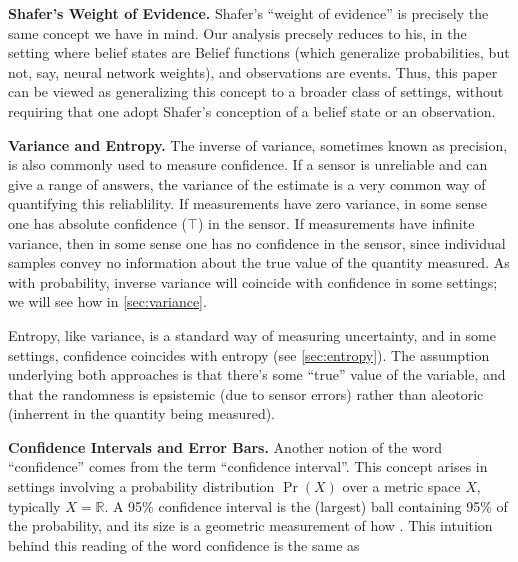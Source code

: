 {	\textbf{Shafer's Weight of Evidence.}
	Shafer's ``weight of evidence'' is precisely the same concept we have in mind.
	Our analysis precsely reduces to his, in the setting where belief states are Belief functions (which generalize probabilities, but not, say, neural network weights), and observations are events.
	Thus, this paper can be viewed as generalizing this concept to a broader class of settings, without requiring that one adopt Shafer's conception of a belief state or an observation.


	\textbf{Variance and Entropy.}
	The inverse of variance, sometimes known as precision,
		is also commonly used to measure confidence.
	If a sensor is unreliable and can give a range of answers, the variance of the estimate is a very common way of quantifying this reliablility.
	If measurements have zero variance, in some sense one has absolute confidence ($\top$) in the sensor. If measurements have infinite variance, then in some sense one has no confidence in the sensor, since individual samples convey no information about the true value of the quantity measured.
	As with probability, inverse variance will coincide with confidence in some settings; we will see how in \cref{sec:variance}.

	Entropy, like variance, is a standard way of measuring uncertainty, and in some settings, confidence coincides with entropy (see \cref{sec:entropy}).
	The assumption underlying both approaches is that there's some ``true'' value of the variable, and that the randomness is epsistemic (due to sensor errors) rather than aleotoric (inherrent in the quantity being measured).

	\textbf{Confidence Intervals and Error Bars.}
	Another notion of the word ``confidence'' comes from the term ``confidence interval''.
	This concept arises in settings involving a probability distribution $\Pr(X)$ over a metric space $X$, typically $X = \mathbb R$.
	A 95\% confidence interval is the (largest) ball containing 95\% of the probability, and its size is a geometric measurement of how .
	This intuition behind this reading of the word confidence is the same as
}






